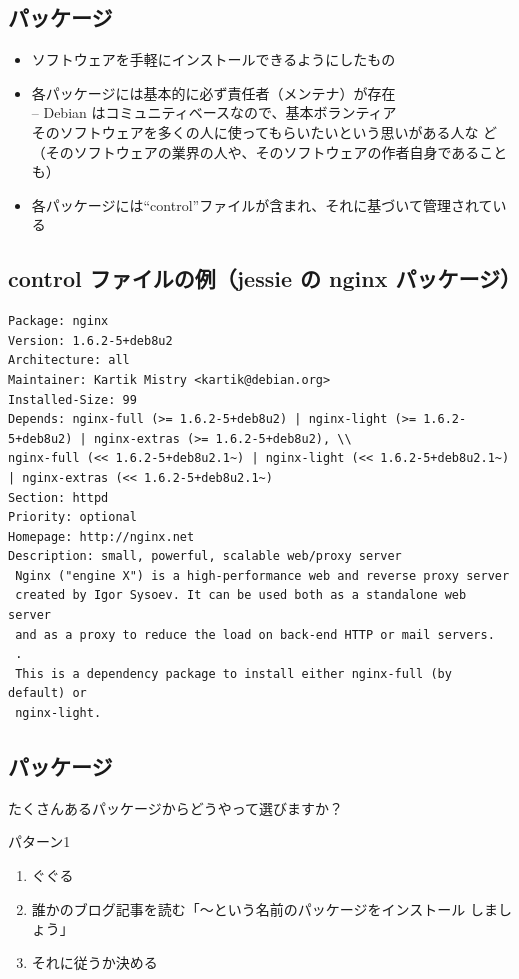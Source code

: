 \documentclass[mingoth,a4paper]{jsarticle}
\begin{document}
\subsection{パッケージ}

\begin{itemize}
 \item ソフトウェアを手軽にインストールできるようにしたもの
 \item 各パッケージには基本的に必ず責任者（メンテナ）が存在\\
       -- Debian はコミュニティベースなので、基本ボランティア\\
       そのソフトウェアを多くの人に使ってもらいたいという思いがある人な
       ど（そのソフトウェアの業界の人や、そのソフトウェアの作者自身であることも）
 \item 各パッケージには“control”ファイルが含まれ、それに基づいて管理されている
\end{itemize}

\subsection{control ファイルの例（jessie の nginx パッケージ）}

{\scriptsize{%
\begin{verbatim}
Package: nginx
Version: 1.6.2-5+deb8u2
Architecture: all
Maintainer: Kartik Mistry <kartik@debian.org>
Installed-Size: 99
Depends: nginx-full (>= 1.6.2-5+deb8u2) | nginx-light (>= 1.6.2-5+deb8u2) | nginx-extras (>= 1.6.2-5+deb8u2), \\
nginx-full (<< 1.6.2-5+deb8u2.1~) | nginx-light (<< 1.6.2-5+deb8u2.1~) | nginx-extras (<< 1.6.2-5+deb8u2.1~)
Section: httpd
Priority: optional
Homepage: http://nginx.net
Description: small, powerful, scalable web/proxy server
 Nginx ("engine X") is a high-performance web and reverse proxy server
 created by Igor Sysoev. It can be used both as a standalone web server
 and as a proxy to reduce the load on back-end HTTP or mail servers.
 .
 This is a dependency package to install either nginx-full (by default) or
 nginx-light.
\end{verbatim}
}}

\subsection{パッケージ}
   たくさんあるパッケージからどうやって選びますか？

   パターン1
   \begin{enumerate}
    \item ぐぐる
    \item 誰かのブログ記事を読む「〜という名前のパッケージをインストール
	  しましょう」
    \item それに従うか決める
   \end{enumerate}
\end{document}
